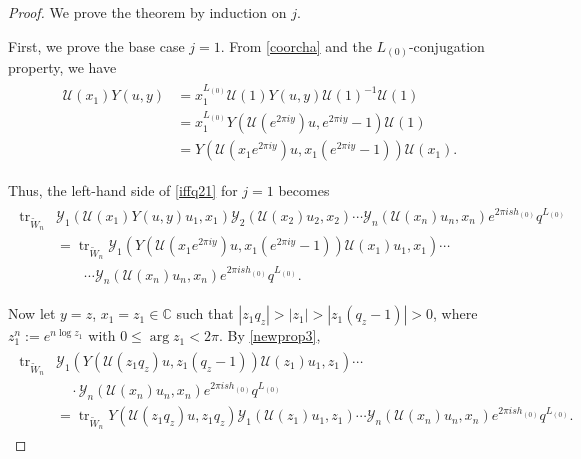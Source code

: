 \documentclass[9pt]{amsart}
\begin{document}
\begin{proof}
We prove the theorem by induction on \( j \).

First, we prove the base case \( j=1 \). From \eqref{coorcha} and the \( L_{(0)} \)-conjugation property, we have
\begin{align}\label{iffq23}
\begin{split}
\mathcal{U}(x_1) Y(u, y) &= x_1^{L_{(0)}} \mathcal{U}(1) Y(u, y) \mathcal{U}(1)^{-1} \mathcal{U}(1) \\
&= x_1^{L_{(0)}} Y(\mathcal{U}(e^{2\pi i y}) u, e^{2\pi i y} - 1) \mathcal{U}(1) \\
&= Y(\mathcal{U}(x_1 e^{2\pi i y}) u, x_1(e^{2\pi i y} - 1)) \mathcal{U}(x_1).
\end{split}
\end{align}

\noindent Thus, the left-hand side of \eqref{iffq21} for \( j=1 \) becomes
\begin{align}\label{iffq24}
\begin{split}
\operatorname{tr}_{\tilde{W}_n} &\mathcal{Y}_1(\mathcal{U}(x_1) Y(u, y) u_1, x_1) \mathcal{Y}_2(\mathcal{U}(x_2) u_2, x_2) \cdots \mathcal{Y}_n(\mathcal{U}(x_n) u_n, x_n) e^{2\pi i s h_{(0)}} q^{L_{(0)}} \\
&= \operatorname{tr}_{\tilde{W}_n} \mathcal{Y}_1(Y(\mathcal{U}(x_1 e^{2\pi i y}) u, x_1(e^{2\pi i y} - 1)) \mathcal{U}(x_1) u_1, x_1) \cdots \\
&\qquad \cdots \mathcal{Y}_n(\mathcal{U}(x_n) u_n, x_n) e^{2\pi i s h_{(0)}} q^{L_{(0)}}.
\end{split}
\end{align}

\noindent Now let \( y = z \), \( x_1 = z_1 \in \mathbb{C} \) such that \( |z_1 q_z| > |z_1| > |z_1(q_z - 1)| > 0 \), where \( z_1^n := e^{n \log z_1} \) with \( 0 \leq \arg z_1 < 2\pi \). By \eqref{newprop3},
\begin{align}\label{iffq24b}
\begin{split}
\operatorname{tr}_{\tilde{W}_n} &\mathcal{Y}_1(Y(\mathcal{U}(z_1 q_z) u, z_1(q_z - 1)) \mathcal{U}(z_1) u_1, z_1) \cdots \\
&\quad \cdot \mathcal{Y}_n(\mathcal{U}(x_n) u_n, x_n) e^{2\pi i s h_{(0)}} q^{L_{(0)}} \\
&= \operatorname{tr}_{\tilde{W}_n} Y(\mathcal{U}(z_1 q_z) u, z_1 q_z) \mathcal{Y}_1(\mathcal{U}(z_1) u_1, z_1) \cdots \mathcal{Y}_n(\mathcal{U}(x_n) u_n, x_n) e^{2\pi i s h_{(0)}} q^{L_{(0)}}.
\end{split}
\end{align}


\end{proof}
\end{document}
